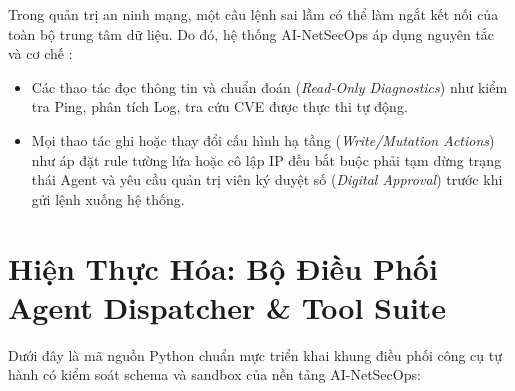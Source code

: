 \begin{definitionbox}
Trong quản trị an ninh mạng, một câu lệnh sai lầm có thể làm ngắt kết nối của toàn bộ trung tâm dữ liệu. Do đó, hệ thống AI-NetSecOps áp dụng nguyên tắc  và cơ chế :
\begin{itemize}
  \item Các thao tác đọc thông tin và chuẩn đoán (\textit{Read-Only Diagnostics}) như kiểm tra Ping, phân tích Log, tra cứu CVE được thực thi tự động.
  \item Mọi thao tác ghi hoặc thay đổi cấu hình hạ tầng (\textit{Write/Mutation Actions}) như áp đặt rule tường lửa hoặc cô lập IP đều bắt buộc phải tạm dừng trạng thái Agent và yêu cầu quản trị viên ký duyệt số (\textit{Digital Approval}) trước khi gửi lệnh xuống hệ thống.
\end{itemize}
\end{definitionbox}

\section{Hiện Thực Hóa: Bộ Điều Phối Agent Dispatcher \& Tool Suite}
\label{sec:capstone-implementation}

Dưới đây là mã nguồn Python chuẩn mực triển khai khung điều phối công cụ tự hành có kiểm soát schema và sandbox của nền tảng AI-NetSecOps:

